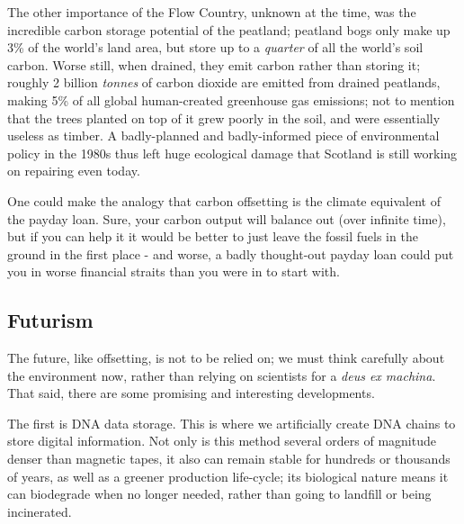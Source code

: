 \documentclass{article}
\begin{document}
The other importance of the Flow Country, unknown at the time, was the incredible carbon storage potential of the peatland; peatland bogs only make up 3\% of the world's land area, but store up to a \emph{quarter} of all the world's soil carbon. \citep{turetsky2015global} Worse still, when drained, they emit carbon rather than storing it; roughly 2 billion \emph{tonnes} of carbon dioxide are emitted from drained peatlands, making 5\% of all global human-created greenhouse gas emissions; not to mention that the trees planted on top of it grew poorly in the soil, and were essentially useless as timber. A badly-planned and badly-informed piece of environmental policy in the 1980s thus left huge ecological damage that Scotland is still working on repairing even today. \citep{gewin2020peat} \newline

One could make the analogy that carbon offsetting is the climate equivalent of the payday loan. Sure, your carbon output will balance out (over infinite time), but if you can help it it would be better to just leave the fossil fuels in the ground in the first place - and worse, a badly thought-out payday loan could put you in worse financial straits than you were in to start with.


\subsection{Futurism}
The future, like offsetting, is not to be relied on; we must think carefully about the environment now, rather than relying on scientists for a \emph{deus ex machina}. That said, there are some promising and interesting developments.\newline

The first is DNA data storage. This is where we artificially create DNA chains to store digital information. Not only is this method several orders of magnitude denser than magnetic tapes, it also can remain stable for hundreds or thousands of years, as well as a greener production life-cycle; its biological nature means it can biodegrade when no longer needed, rather than going to landfill or being incinerated. \citep{nguyen2020architecting}\newline
\end{document}

